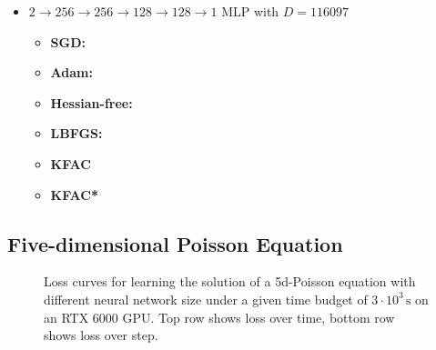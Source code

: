 \begin{itemize}
\item $2 \to 256 \to 256\to 128 \to 128 \to 1$ MLP with $D=\num{116097}$
  \begin{itemize}
    \def\pathToRuns{../kfac_pinns_exp/exp20_poisson2d_mlp_tanh_256/tex}
  \item \textbf{SGD:} 
  \item \textbf{Adam:} 
  \item \textbf{Hessian-free:} 
  \item \textbf{LBFGS:} 
  \item \textbf{KFAC} 
  \item \textbf{KFAC*} 
  \end{itemize}
\end{itemize}

\subsection{Five-dimensional Poisson Equation}

\begin{figure}[!h]
  \centering
  \caption{Loss curves for learning the solution of a 5d-Poisson equation with different neural network size under a given time budget of $3\cdot 10^3\,\text{s}$ on an RTX 6000 GPU.
    Top row shows loss over time, bottom row shows loss over step.}
\end{figure}

